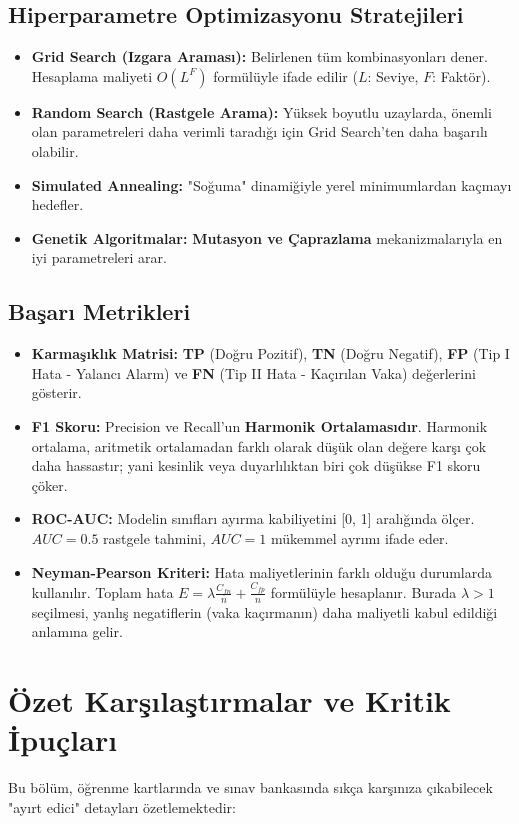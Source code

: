 \documentclass[12pt,a4paper]{article}
\begin{document}
\subsection{Hiperparametre Optimizasyonu Stratejileri}
\begin{itemize}
    \item \textbf{Grid Search (Izgara Araması):} Belirlenen tüm kombinasyonları dener. Hesaplama maliyeti $O(L^F)$ formülüyle ifade edilir ($L$: Seviye, $F$: Faktör).
    \item \textbf{Random Search (Rastgele Arama):} Yüksek boyutlu uzaylarda, önemli olan parametreleri daha verimli taradığı için Grid Search'ten daha başarılı olabilir.
    \item \textbf{Simulated Annealing:} "Soğuma" dinamiğiyle yerel minimumlardan kaçmayı hedefler.
    \item \textbf{Genetik Algoritmalar:} \textbf{Mutasyon ve Çaprazlama} mekanizmalarıyla en iyi parametreleri arar.
\end{itemize}

\subsection{Başarı Metrikleri}
\begin{itemize}
    \item \textbf{Karmaşıklık Matrisi:} \textbf{TP} (Doğru Pozitif), \textbf{TN} (Doğru Negatif), \textbf{FP} (Tip I Hata - Yalancı Alarm) ve \textbf{FN} (Tip II Hata - Kaçırılan Vaka) değerlerini gösterir.
    \item \textbf{F1 Skoru:} Precision ve Recall'un \textbf{Harmonik Ortalamasıdır}. Harmonik ortalama, aritmetik ortalamadan farklı olarak düşük olan değere karşı çok daha hassastır; yani kesinlik veya duyarlılıktan biri çok düşükse F1 skoru çöker.
    \item \textbf{ROC-AUC:} Modelin sınıfları ayırma kabiliyetini [0, 1] aralığında ölçer. $AUC=0.5$ rastgele tahmini, $AUC=1$ mükemmel ayrımı ifade eder.
    \item \textbf{Neyman-Pearson Kriteri:} Hata maliyetlerinin farklı olduğu durumlarda kullanılır. Toplam hata $E = \lambda \frac{C_{fn}}{n} + \frac{C_{fp}}{n}$ formülüyle hesaplanır. Burada $\lambda > 1$ seçilmesi, yanlış negatiflerin (vaka kaçırmanın) daha maliyetli kabul edildiği anlamına gelir.
\end{itemize}

\newpage
\section{Özet Karşılaştırmalar ve Kritik İpuçları}
Bu bölüm, öğrenme kartlarında ve sınav bankasında sıkça karşınıza çıkabilecek "ayırt edici" detayları özetlemektedir:
\end{document}

